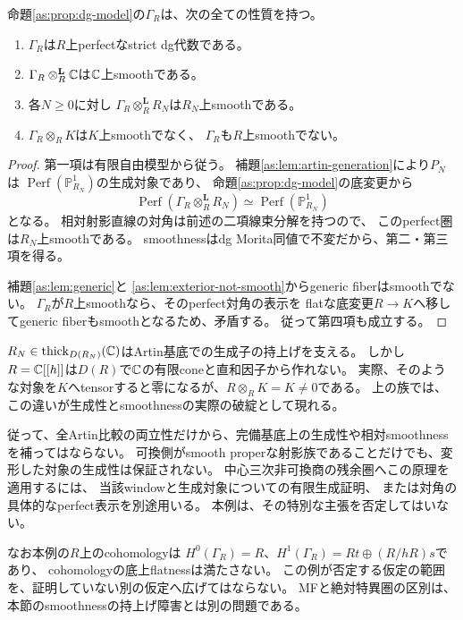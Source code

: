 \begin{theorem}[全Artin切断ではsmoothだが完備基底ではsmoothでない族]
\label{as:thm:obstruction}
命題\ref{as:prop:dg-model}の$\Gamma_R$は、次の全ての性質を持つ。
\begin{enumerate}
 \item $\Gamma_R$は$R$上perfectなstrict dg代数である。
 \item $\Gamma_R\otimes_R^{\mathbf L}\mathbb C$は$\mathbb C$上smoothである。
 \item 各$N\ge0$に対し
 $\Gamma_R\otimes_R^{\mathbf L}R_N$は$R_N$上smoothである。
 \item $\Gamma_R\otimes_R K$は$K$上smoothでなく、
 $\Gamma_R$も$R$上smoothでない。
\end{enumerate}
\end{theorem}
\begin{proof}
第一項は有限自由模型から従う。
補題\ref{as:lem:artin-generation}により$P_N$は
$\operatorname{Perf}(\mathbb P^1_{R_N})$の生成対象であり、
命題\ref{as:prop:dg-model}の底変更から
\[
 \operatorname{Perf}(\Gamma_R\otimes_R^{\mathbf L}R_N)
 \simeq\operatorname{Perf}(\mathbb P^1_{R_N})
\]
となる。
相対射影直線の対角は前述の二項線束分解を持つので、
このperfect圏は$R_N$上smoothである。
smoothnessはdg Morita同値で不変だから、第二・第三項を得る。

補題\ref{as:lem:generic}と
\ref{as:lem:exterior-not-smooth}からgeneric fiberはsmoothでない。
$\Gamma_R$が$R$上smoothなら、そのperfect対角の表示を
flatな底変更$R\to K$へ移してgeneric fiberもsmoothとなるため、矛盾する。
従って第四項も成立する。
\end{proof}

\begin{remark}[この反例の適用範囲]
$R_N\in\operatorname{thick}_{D(R_N)}(\mathbb C)$はArtin基底での生成子の持上げを支える。
しかし$R=\mathbb C[[h]]$は$D(R)$で$\mathbb C$の有限coneと直和因子から作れない。
実際、そのような対象を$K$へtensorすると零になるが、$R\otimes_RK=K\ne0$である。
上の族では、この違いが生成性とsmoothnessの実際の破綻として現れる。

従って、全Artin比較の両立性だけから、完備基底上の生成性や相対smoothnessを補ってはならない。
可換側がsmooth properな射影族であることだけでも、変形した対象の生成性は保証されない。
中心三次非可換商の残余圏へこの原理を適用するには、
当該windowと生成対象についての有限生成証明、
または対角の具体的なperfect表示を別途用いる。
本例は、その特別な主張を否定してはいない。

なお本例の$R$上のcohomologyは
$H^0(\Gamma_R)=R$、$H^1(\Gamma_R)=Rt\oplus(R/hR)s$であり、
cohomologyの底上flatnessは満たさない。
この例が否定する仮定の範囲を、証明していない別の仮定へ広げてはならない。
MFと絶対特異圏の区別は、本節のsmoothnessの持上げ障害とは別の問題である。
\end{remark}
